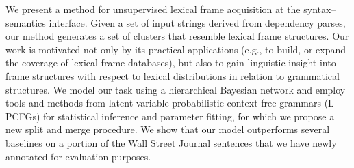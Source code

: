 We present a method for unsupervised lexical frame acquisition at the syntax--semantics interface. Given a set of input strings derived from dependency parses, our method generates a set of clusters that resemble lexical frame structures. Our work is motivated not only by its practical applications (e.g., to build, or expand the coverage of lexical frame databases), but also to gain linguistic insight into frame structures with respect to lexical distributions in relation to grammatical structures. We model our task using a hierarchical Bayesian network and employ tools and methods from latent variable probabilistic context free grammars (L-PCFGs) for statistical inference and parameter fitting, for which we propose a new split and merge procedure. We show that our model outperforms several baselines on a portion of the Wall Street Journal sentences that we have newly annotated for evaluation purposes.
